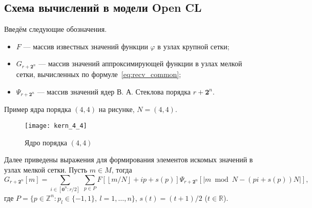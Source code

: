 
\label{sec:func_recv}

\subsection*{Схема вычислений в модели Open CL}


Введём  следующие обозначения.
\begin{itemize}

\item
  $F$  --- массив  известных значений функции $\varphi$
  в узлах крупной сетки;

\item
  $G_{r+\mathbf{2}^n}$ --- массив
  значений аппроксимирующей функции в узлах мелкой сетки,
  вычисленных по формуле~\eqref{eq:recv_common};

\item
  $\Psi_{r+\mathbf{2}^n}$ --- массив  значений ядер В. А. Стеклова порядка $r+\mathbf{2}^n$.

\end{itemize}




Пример ядра порядка $(4,4)$ на рисунке, $N=(4,4)$.

\begin{figure}[h!]
  \centering
  \texttt{[image: kern\_4\_4]} 
  \caption{Ядро  порядка $(4,4)$}
  \label{fig:reg_net}
\end{figure}
\FloatBarrier


 Далее приведены выражения для формирования
 элементов искомых значений в узлах мелкой сетки.
Пусть $m\in M$, тогда
\begin{equation}
  \label{eq:nd}
    G_{r+\mathbf{2}^n}[m] = 
    \sum_{i \in  [\mathbf{0}^n:r/2]}\ \sum_{p\in P} 
        F \left[ \left \lfloor {m}/{N} \right \rfloor + ip + s(p)\right]
      \Psi_{r+\mathbf{2}^n}[|m\bmod N - (pi + s(p))N|],
\end{equation}
где $P=\{p\in\mathbb{Z}^n: p_l\in\{-1,1\},\ l=1,\ldots,n\}$, $s(t)=(t+1)/2$
($t\in\mathbb{R}$).


